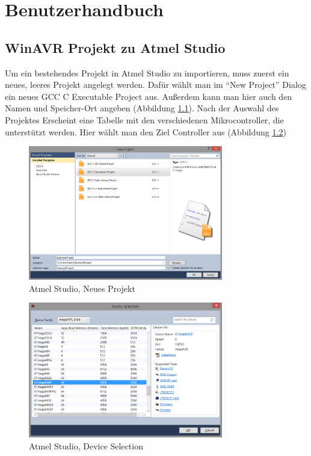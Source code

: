 \chapter{Benutzerhandbuch} 
\label{chap:Benutzerhandbuch}

\section{WinAVR Projekt zu Atmel Studio}

Um ein bestehendes Projekt in Atmel Studio zu importieren, muss zuerst ein
neues, leeres Projekt angelegt werden.
Dafür wählt man im "`New Project"' Dialog ein neues GCC C Executable Project
aus. Außerdem kann man hier auch den Namen und Speicher-Ort angeben (Abbildung
\ref{import.new}). Nach der Auswahl des Projektes Erscheint eine Tabelle mit den
verschiedenen Mikrocontroller, die unterstützt werden. Hier wählt man den Ziel
Controller aus (Abbildung \ref{new.choose})

\begin{figure}[htp]
\begin{center}
  \includegraphics[width=8.5cm]{content/pictures/Import/1neuesProjekt.png}
  \caption{Atmel Studio, Neues Projekt}
  \label{import.new}
\end{center}
\end{figure}

\begin{figure}[H]
\begin{center}
  \includegraphics[width=8.5cm]{content/pictures/Import/2porzessorAuswahl.png}
  \caption{Atmel Studio, Device Selection}
  \label{new.choose}
\end{center}
\end{figure}

